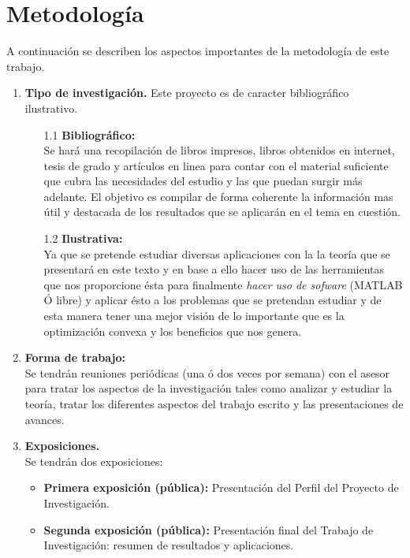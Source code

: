 \section{Metodolog\'ia}

A continuaci\'on se describen los aspectos importantes de la metodolog\'ia de este trabajo.

\begin{enumerate}
  \item \textbf{Tipo de investigaci\'on.}
	Este proyecto es de caracter bibliogr\'afico ilustrativo.
   \begin{itemize}
      \item[1.1] \textbf{Bibliogr\'afico:}\\
	    Se har\'a una recopilaci\'on de libros impresos, libros obtenidos en internet, tesis de grado y art\'iculos en linea
	    para contar con el material suficiente que cubra las necesidades del estudio y las que puedan surgir m\'as adelante.
	    El objetivo es compilar de forma coherente la informaci\'on mas \'util y destacada de los resultados que se aplicar\'an
	    en el tema en cuesti\'on.
      \item[1.2] \textbf{Ilustrativa:}\\
	    Ya que se pretende estudiar diversas aplicaciones con la la teor\'ia que se presentar\'a en este texto y en base a ello hacer uso
	    de las herramientas que nos proporcione \'esta para finalmente {\it hacer uso de sofware} (MATLAB \'O libre) y aplicar \'esto a 
	    los problemas que se pretendan estudiar y de esta manera tener una mejor visi\'on de lo importante que es la optimizaci\'on convexa
	    y los beneficios que nos genera.
   \end{itemize}
   \item \textbf{Forma de trabajo:}\\
	 Se tendr\'an reuniones peri\'odicas (una \'o dos veces por semana) con el asesor para tratar los aspectos de la 
	 investigaci\'on tales como analizar y estudiar la teor\'ia, tratar los diferentes aspectos del trabajo escrito y las 
	 presentaciones de avances.
   \item \textbf{Exposiciones.}\\
	 Se tendr\'an dos exposiciones:
	 \begin{itemize}
	    \item \textbf{Primera exposici\'on (p\'ublica):} Presentaci\'on del Perfil del Proyecto de Investigaci\'on.
	    \item \textbf{Segunda exposici\'on (p\'ublica):} Presentaci\'on final del Trabajo de Investigaci\'on: resumen de resultados
		  y aplicaciones.
	 \end{itemize}
\end{enumerate}




